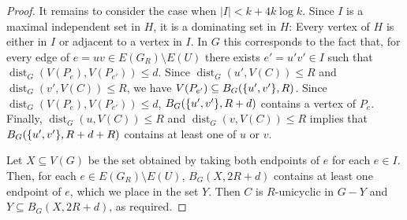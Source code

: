 \documentclass{patmorin}
\DeclareMathOperator{\dist}{dist}
\DeclarePairedDelimiter\set{\{}{\}}
\begin{document}
\begin{proof}
  It remains to consider the case when $|I| < k+4k\log k$. 
  Since $I$ is a maximal independent set in $H$, it is a dominating set in $H$: Every vertex of $H$ is either in $I$ or adjacent to a vertex in $I$.  In $G$ this corresponds to the fact that, for every edge of $e=uv\in E(G_R)\setminus E(U)$ there exists $e'=u'v'\in I$ such that $\dist_G(V(P_{e}),V(P_{e'}))\le d$. 
  Since $\dist_G(u',V(C))\leq R$ and $\dist_G(v',V(C))\leq R$, 
  we have $V(P_{e'}) \subseteq B_G(\set{u',v'},R)$. Since $\dist_G(V(P_e),V(P_{e'}))\le d$,  $B_G(\set{u',v'},R+d)$ contains a vertex of $P_e$. 
  Finally, $\dist_G(u,V(C))\leq R$ and $\dist_G(v,V(C))\leq R$ implies that 
  $B_{G}(\set{u',v'},R+d+R)$ contains at least one of $u$ or $v$. 
   
  Let $X\subseteq V(G)$ be the set obtained by taking both endpoints of $e$ for each $e\in I$.  Then, for each $e\in E(G_R)\setminus E(U)$, $B_G(X,2R+d)$ contains at least one endpoint of $e$, which we place in the set $Y$.  Then $C$ is $R$-unicyclic in $G-Y$ and $Y\subseteq B_G(X,2R+d)$, as required.
\end{proof}


  
  
  
  
  
  
\end{document}
